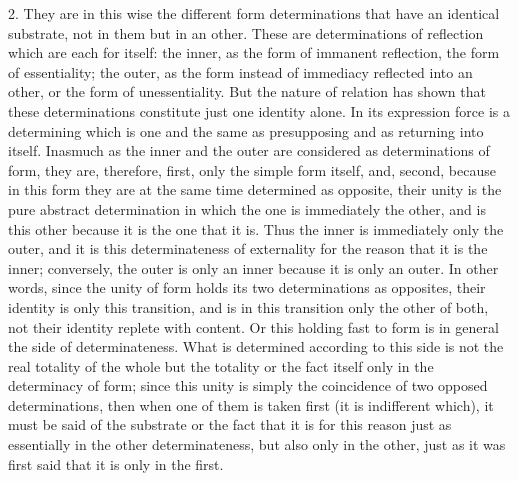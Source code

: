2. They are in this wise the different form determinations
that have an identical substrate, not in them but in an other.
These are determinations of reflection which are each for itself:
the inner, as the form of immanent reflection, the form of essentiality;
the outer, as the form instead of immediacy reflected into an other,
or the form of unessentiality.
But the nature of relation has shown that these determinations
constitute just one identity alone.
In its expression force is a determining which is one and the same
as presupposing and as returning into itself.
Inasmuch as the inner and
the outer are considered as determinations of form, they are, therefore,
first, only the simple form itself, and, second, because in this form they are
at the same time determined as opposite, their unity is the pure abstract
determination in which the one is immediately the other, and is this other
because it is the one that it is. Thus the inner is immediately only the outer,
and it is this determinateness of externality for the reason that it is the inner;
conversely, the outer is only an inner because it is only an outer.
In other words, since the unity of form holds its two determinations as opposites,
their identity is only this transition,
 and is in this transition only the other
of both, not their identity replete with content.
 Or this holding fast to form
is in general the side of determinateness.
 What is determined according to
this side is not the real totality of the whole but the totality or the fact itself
only in the determinacy of form;
since this unity is simply the coincidence
of two opposed determinations, then when one of them is taken first (it is
indifferent which),
it must be said of the substrate or the fact that it is for
this reason just as essentially in the other determinateness,
but also only in the other, just as it was first said that it is only in the first.

